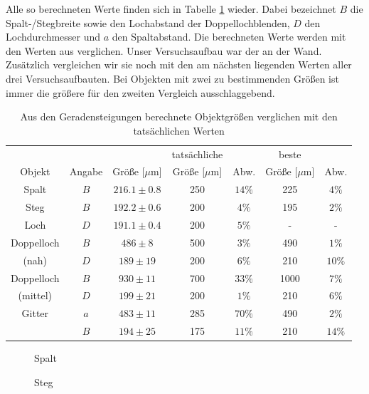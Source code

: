 \documentclass[12pt,a4paper,titlepage,headinclude,bibtotoc]{scrartcl}
\begin{document}
Alle so berechneten Werte finden sich in Tabelle \ref{tab:objektgroessen} wieder.
Dabei bezeichnet $B$ die Spalt-/Stegbreite sowie den Lochabstand der Doppellochblenden, $D$ den Lochdurchmesser und $a$ den Spaltabstand.
Die berechneten Werte werden mit den Werten aus \cite[S.196]{prakti} verglichen.
Unser Versuchsaufbau war der an der Wand.
Zusätzlich vergleichen wir sie noch mit den am nächsten liegenden Werten aller drei Versuchsaufbauten.
Bei Objekten mit zwei zu bestimmenden Größen ist immer die größere für den zweiten Vergleich ausschlaggebend.

\begin{table}[!htb]
	\centering
	\begin{tabular}{|c|c||c||c|c||c|c|}
		\hline
		 & & & tatsächliche &  & beste &  \\
		Objekt & Angabe & Größe [$\mu$m] & Größe [$\mu$m] & Abw. & Größe [$\mu$m] & Abw. \\
		\hline
		\hline
		Spalt & $B$ & $216.1 \pm 0.8$ & 250 & $14\%$ & 225 & $4\%$ \\
		Steg & $B$ & $192.2 \pm 0.6$ & 200 & $4\%$ & 195 & $2\%$ \\
		Loch & $D$ & $191.1 \pm 0.4$ & 200 & $5\%$ & - & - \\
		\hline
		Doppelloch & $B$ & $486 \pm 8$ & 500 & $3\%$ & 490 & $1\%$ \\
		(nah) & $D$ & $189 \pm 19$ & 200 & $6\%$ & 210 & $10\%$ \\
		\hline
		Doppelloch & $B$& $930 \pm 11$ & 700 & $33\%$ & 1000 & $7\%$ \\
		(mittel) & $D$& $199 \pm 21$ & 200 & $1\%$ & 210 & $6\%$ \\
		\hline		
		Gitter & $a$ & $483  \pm 11$ & 285 & $70\%$ & 490 & $2\%$ \\
		& $B$ & $194 \pm 25$ & 175 & $11\%$ & 210 & $14\%$ \\
		\hline
	\end{tabular}
	\caption{Aus den Geradensteigungen berechnete Objektgrößen verglichen mit den tatsächlichen Werten}
	\label{tab:objektgroessen}
\end{table}

\begin{figure}[!htb]
	\centering
	
	\caption{Spalt}
	\label{fig:spalt_reg}
\end{figure}

\begin{figure}[!htb]
	\centering
	
	\caption{Steg}
	\label{fig:steg_reg}
\end{figure}
\end{document}
